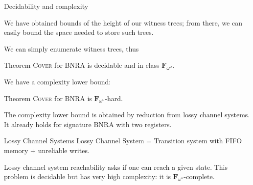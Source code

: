 \documentclass{beamer}
\newcommand{\COVER}{\textsc{Cover}\xspace}
\begin{document}
			
				
				
			
	

\begin{frame}{Decidability and complexity}
	
	We have obtained bounds of the height of our witness trees; from there, we can easily bound the space needed to store such trees.
	
	\pause
	We can simply enumerate witness trees, thus
	
	\begin{block}{Theorem}
		{\COVER} for BNRA is decidable and in class $\mathbf{F}_{\omega^\omega}$.
	\end{block}
	
	\pause
	
	We have a complexity lower bound:
		\begin{block}{Theorem}
		{\COVER} for BNRA is $\mathbf{F}_{\omega^\omega}$-hard.
	\end{block}
	The complexity lower bound is obtained by reduction from lossy channel systems\footnotemark. It already holds for signature BNRA with two registers.

\end{frame}


	
\begin{frame}{Lossy Channel Systems}
	Lossy Channel System = Transition system with FIFO memory + unreliable writes.
	
	\begin{center}
	\resizebox{!}{4.5cm}{
	
	}
	\end{center}

	 Lossy channel system reachability asks if one can reach a given state. This problem is decidable but has very high complexity: it is $\mathbf{F}_{\omega^\omega}$-complete. 
\end{frame}
\end{document}
